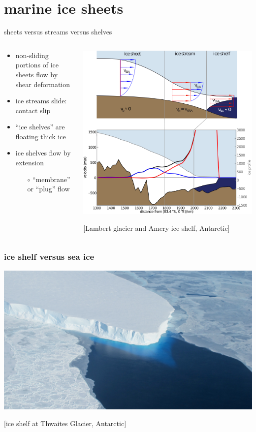 \documentclass{beamer}
\newcommand{\contactslipslide}{
\begin{frame}{sheets versus streams versus shelves}

\begin{columns}
\begin{column}{0.35\textwidth}
\small
\begin{itemize}
\small
\item non-sliding portions of ice sheets flow by shear deformation
\item ice streams slide: \alert{contact slip}
\item ``ice shelves'' are floating thick ice
\item ice shelves flow by extension
  \begin{itemize}
  \scriptsize
  \item[$\circ$] ``membrane'' or ``plug'' flow
  \end{itemize}
\end{itemize}
\end{column}

\begin{column}{0.65\textwidth}
\includegraphics[width=1.1\textwidth]{siassacartoon-lambert}

\begin{center}
\vspace{-0.18in}
\tiny [Lambert glacier and Amery ice shelf, Antarctic]
\end{center}
\end{column}
\end{columns}
\end{frame}
}
\begin{document}
\section{marine ice sheets}


\contactslipslide


\begin{frame}
  \frametitle{ice shelf versus sea ice}

\begin{center}
\vspace{-0.2in}

\includegraphics[width=1.0\textwidth]{supp4rignot-small}

\medskip
\tiny [ice shelf at Thwaites Glacier, Antarctic]
\end{center}
\end{frame}
\end{document}
